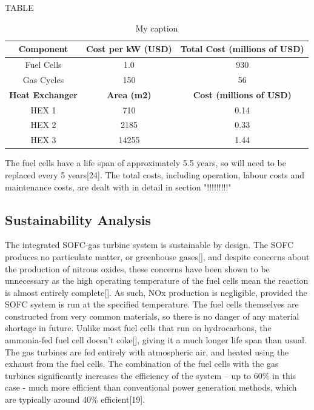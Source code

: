 TABLE
\begin{table}[h!]
\centering
\caption{My caption}
\label{my-label}
\begin{tabular}{|c|c|c|}
\hline
\textbf{Component}      & \textbf{Cost per kW (USD)} & \textbf{Total Cost (millions of USD)} \\ \hline
Fuel Cells              & 1.0                        & 930                                   \\ \hline
Gas Cycles              & 150                        & 56                                    \\ \hline
\textbf{Heat Exchanger} & \textbf{Area (m2)}         & \textbf{Cost (millions of USD)}       \\ \hline
HEX 1                   & 710                        & 0.14                                  \\ \hline
HEX 2                   & 2185                       & 0.33                                  \\ \hline
HEX 3                   & 14255                      & 1.44                                  \\ \hline
\end{tabular}
\end{table}
The fuel cells have a life span of approximately 5.5 years, so will need to be replaced every 5 years[24]. The total costs, including operation, labour costs and maintenance costs, are dealt with in detail in section "!!!!!!!!!"

\subsection{Sustainability Analysis}
The integrated SOFC-gas turbine system is sustainable by design. The SOFC produces no particulate matter, or greenhouse gases[], and despite concerns about the production of nitrous oxides, these concerns have been shown to be unnecessary as the high operating temperature of the fuel cells mean the reaction is almost entirely complete[]. As such, NOx production is negligible, provided the SOFC system is run at the specified temperature. The fuel cells themselves are constructed from very common materials, so there is no danger of any material shortage in future. Unlike most fuel cells that run on hydrocarbons, the ammonia-fed fuel cell doesn’t coke[], giving it a much longer life span than usual. The gas turbines are fed entirely with atmospheric air, and heated using the exhaust from the fuel cells. The combination of the fuel cells with the gas turbines significantly increases the efficiency of the system – up to 60\% in this case - much more efficient than conventional power generation methods, which are typically around 40\% efficient[19].
